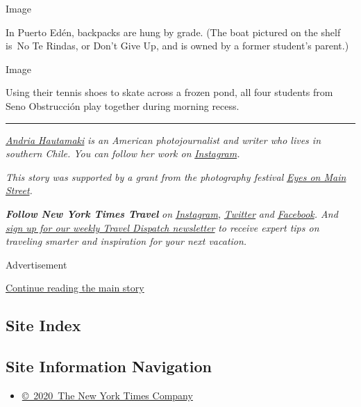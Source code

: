 Image

In Puerto Edén, backpacks are hung by grade. (The boat pictured on the
shelf is~No Te Rindas, or Don't Give Up, and is owned by a former
student's parent.)

Image

Using their tennis shoes to skate across a frozen pond, all four
students from Seno Obstrucción play together during morning recess.

\begin{center}\rule{0.5\linewidth}{\linethickness}\end{center}

\href{https://www.ahowdyphoto.com/}{\emph{Andria Hautamaki}} \emph{is an
American photojournalist and writer who lives in southern Chile. You can
follow her work on}
\href{https://www.instagram.com/ahowdyphoto/}{\emph{Instagram}}\emph{.}

\emph{This story was supported by a grant from the photography festival}
\href{https://www.eyesonmainstreetwilson.com/}{\emph{Eyes on Main
Street}}\emph{.}

\emph{\textbf{Follow New York Times Travel}} \emph{on}
\href{https://www.instagram.com/nytimestravel/}{\emph{Instagram}}\emph{,}
\href{https://twitter.com/nytimestravel}{\emph{Twitter}} \emph{and}
\href{https://www.facebook.com/nytimestravel/}{\emph{Facebook}}\emph{.
And}
\href{https://www.nytimes.com/newsletters/traveldispatch}{\emph{sign up
for our weekly Travel Dispatch newsletter}} \emph{to receive expert tips
on traveling smarter and inspiration for your next vacation.}

Advertisement

\protect\hyperlink{after-bottom}{Continue reading the main story}

\hypertarget{site-index}{%
\subsection{Site Index}\label{site-index}}

\hypertarget{site-information-navigation}{%
\subsection{Site Information
Navigation}\label{site-information-navigation}}

\begin{itemize}
\tightlist
\item
  \href{https://help.nytimes.com/hc/en-us/articles/115014792127-Copyright-notice}{©~2020~The
  New York Times Company}
\end{itemize}

